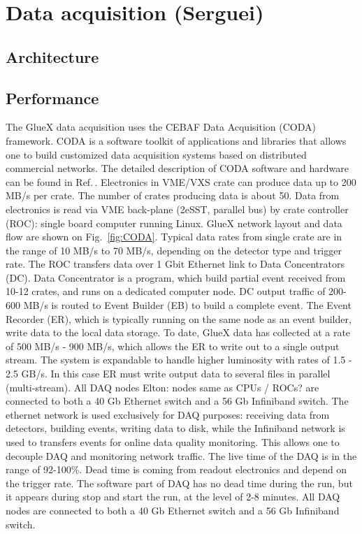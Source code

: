 
\section{Data acquisition (Serguei) \label{sec:daq}}

\subsection{Architecture \label{sec:daqarchitecture}}

\subsection{Performance \label{sec:daqperformance}}

The GlueX data acquisition uses the CEBAF Data Acquisition (CODA) framework. CODA is a software toolkit of applications and libraries that allows one to build customized data acquisition systems based on distributed commercial networks. The detailed description of CODA software and hardware can be found in Ref.\,\cite{CLASS12_DAQ}. 
Electronics in VME/VXS crate can produce data up to 200 MB/s per crate.
The number of crates producing data is about 50.
Data from electronics is read via VME back-plane (2eSST, parallel bus) by crate controller (ROC): single board computer running Linux.
GlueX network layout and data flow are shown on Fig.~\ref{fig:CODA}.
Typical data rates from single crate are in the range of 10 MB/s to 70 MB/s, depending on the detector type and trigger rate.
The ROC transfers data over 1 Gbit Ethernet link to Data Concentrators (DC).
Data Concentrator is a program, which build partial event received from 10-12 crates, and runs on a dedicated computer node.
DC output traffic of 200-600 MB/s is routed to Event Builder (EB) to build a complete event.
The Event Recorder (ER), which is typically running on the same node as an event builder, write data to the local data storage.
To date, GlueX data has collected at a rate of 500 MB/s - 900 MB/s, which allows the ER to write out to a single output stream. The system is expandable to handle higher luminosity with rates of 1.5 - 2.5 GB/s. In this case ER must write output data to several files in parallel (multi-stream).
All DAQ nodes {\color{red} Elton: nodes same as CPUs / ROCs? } are connected to both a 40 Gb Ethernet switch and a 56 Gb Infiniband switch.
The ethernet network is used exclusively for DAQ purposes: receiving data from detectors, building events, writing data to disk, 
while the Infiniband network is used to transfers events for online data quality monitoring. 
This allows one to decouple DAQ and monitoring network traffic.
The live time of the DAQ is in the range of 92-100\%. Dead time is coming from readout electronics and depend on the trigger rate.  
The software part of DAQ has no dead time during the run, but it appears during stop and start the run, at the level of 2-8 minutes. All DAQ nodes are connected to both a 40 Gb Ethernet switch and a 56 Gb Infiniband switch.



